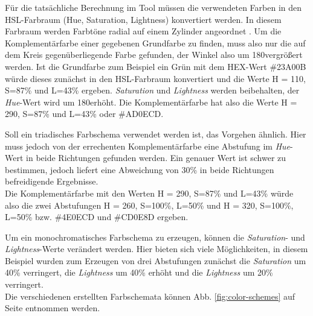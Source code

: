 Für die tatsächliche Berechnung im Tool müssen die verwendeten Farben in den HSL-Farbraum (Hue, Saturation, Lightness) konvertiert werden. In diesem Farbraum werden Farbtöne radial auf einem Zylinder angeordnet \cite{joblove1978color}.
Um die Komplementärfarbe einer gegebenen Grundfarbe zu finden, muss also nur die auf dem Kreis gegenüberliegende Farbe gefunden, der Winkel also um 180\degree vergrößert werden. 
Ist die Grundfarbe zum Beispiel ein Grün mit dem HEX-Wert \#23A00B würde dieses zunächst in den HSL-Farbraum konvertiert und die Werte H = 110\degree, S=87\% und L=43\% ergeben. \textit{Saturation} und \textit{Lightness} werden beibehalten, der \textit{Hue}-Wert wird um 180\degree erhöht. Die Komplementärfarbe hat also die Werte  H = 290\degree, S=87\% und L=43\% oder \#AD0ECD.

Soll ein triadisches Farbschema verwendet werden ist, das Vorgehen ähnlich. Hier muss jedoch von der errechenten Komplementärfarbe eine Abstufung im \textit{Hue}-Wert in beide Richtungen gefunden werden. Ein genauer Wert ist schwer zu bestimmen, jedoch liefert eine Abweichung von 30\% in beide Richtungen befreidigende Ergebnisse.\\
Die Komplementärfarbe mit den Werten  H = 290\degree, S=87\% und L=43\% würde also die zwei Abstufungen H = 260\degree, S=100\%, L=50\% und H = 320\degree, S=100\%, L=50\% bzw. \#4E0ECD und \#CD0E8D ergeben.

Um ein monochromatisches Farbschema zu erzeugen, können die \textit{Saturation}- und \textit{Lightness}-Werte verändert werden. Hier bieten sich viele Möglichkeiten, in diesem Beispiel wurden zum Erzeugen von drei Abstufungen zunächst die \textit{Saturation} um 40\% verringert, die \textit{Lightness} um 40\% erhöht und die \textit{Lightness} um 20\% verringert.\\
Die verschiedenen erstellten Farbschemata können Abb. \ref{fig:color-schemes} auf Seite \pageref{fig:color-schemes} entnommen werden. 

